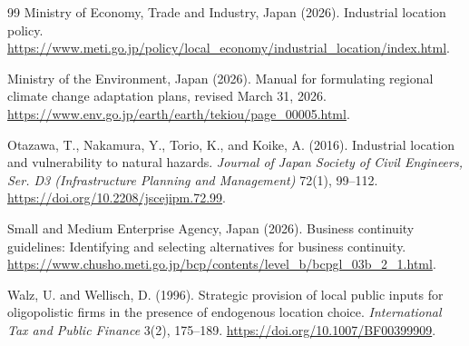 \begin{thebibliography}{99}
Ministry of Economy, Trade and Industry, Japan (2026).
\newblock Industrial location policy.
\newblock \url{https://www.meti.go.jp/policy/local_economy/industrial_location/index.html}.

Ministry of the Environment, Japan (2026).
\newblock Manual for formulating regional climate change adaptation plans, revised March 31, 2026.
\newblock \url{https://www.env.go.jp/earth/earth/tekiou/page_00005.html}.

Otazawa, T., Nakamura, Y., Torio, K., and Koike, A. (2016).
\newblock Industrial location and vulnerability to natural hazards.
\newblock \emph{Journal of Japan Society of Civil Engineers, Ser. D3 (Infrastructure Planning and Management)} 72(1), 99--112. \url{https://doi.org/10.2208/jscejipm.72.99}.

Small and Medium Enterprise Agency, Japan (2026).
\newblock Business continuity guidelines: Identifying and selecting alternatives for business continuity.
\newblock \url{https://www.chusho.meti.go.jp/bcp/contents/level_b/bcpgl_03b_2_1.html}.

Walz, U. and Wellisch, D. (1996).
\newblock Strategic provision of local public inputs for oligopolistic firms in the presence of endogenous location choice.
\newblock \emph{International Tax and Public Finance} 3(2), 175--189. \url{https://doi.org/10.1007/BF00399909}.

\end{thebibliography}
